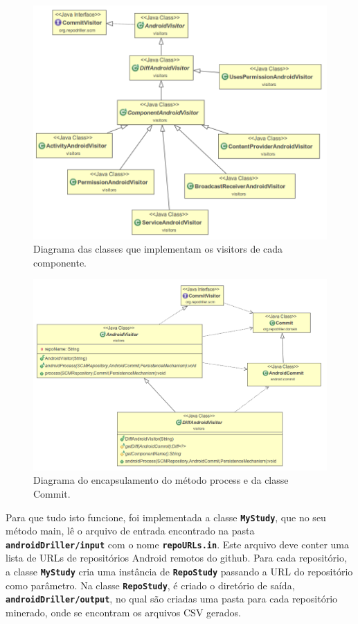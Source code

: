 \documentclass[a4paper,12pt]{article}
\begin{document}
{%
\begin{figure}[h]
\centering
\includegraphics[width=0.8\linewidth]{imgs/visitors.png}
\caption{Diagrama das classes que implementam os visitors de cada componente.}
\label{fig:visitors}
\end{figure}


\begin{figure}[h]
\centering
\includegraphics[width=\linewidth]{imgs/diagram.png}
\caption{Diagrama do encapsulamento do método process e da classe Commit.}
\label{fig:diagram}
\end{figure}


Para que tudo isto funcione, foi implementada a classe {\small\texttt{\textbf{MyStudy}}}, que no seu método main,  lê o arquivo de entrada encontrado na pasta {\small\texttt{\textbf{androidDriller/input}}} com o nome {\small\texttt{\textbf{repoURLs.in}}}. Este arquivo deve conter uma lista de URLs de repositórios Android remotos do github. Para cada repositório, a classe {\small\texttt{\textbf{MyStudy}}} cria uma instância de {\small\texttt{\textbf{RepoStudy}}} passando a URL do repositório como parâmetro. Na classe {\small\texttt{\textbf{RepoStudy}}}, é criado o diretório de saída, {\small\texttt{\textbf{androidDriller/output}}}, no qual são criadas uma pasta para cada repositório minerado,  onde se encontram os arquivos CSV gerados. 


}
\end{document}
